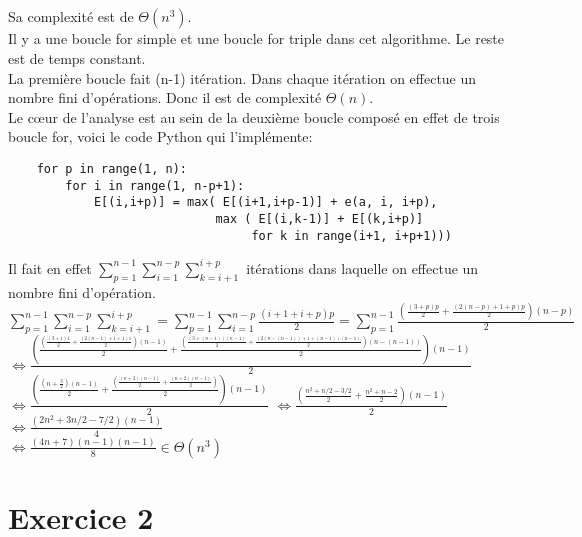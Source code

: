 \documentclass[french]{article}
\begin{document}
\subsection{}
Sa complexité est de $\Theta(n^3)$.\\
Il y a une boucle for simple et une boucle for triple dans cet algorithme. Le reste est de temps constant.\\
La première boucle fait (n-1) itération. Dans chaque itération on effectue un nombre fini d'opérations. Donc il est de complexité $\Theta(n)$.\\
Le cœur de l'analyse est au sein de la deuxième boucle composé en effet de trois boucle for, voici le code Python qui l'implémente:
\begin{lstlisting}
    for p in range(1, n):
        for i in range(1, n-p+1):
            E[(i,i+p)] = max( E[(i+1,i+p-1)] + e(a, i, i+p),
                             max ( E[(i,k-1)] + E[(k,i+p)]
                                  for k in range(i+1, i+p+1)))
\end{lstlisting}
Il fait en effet $\sum_{p=1}^{n-1}\sum_{i=1}^{n-p}\sum_{k=i+1}^{i+p}$ itérations dans laquelle on effectue un nombre fini d'opération.\\
$\sum_{p=1}^{n-1}\sum_{i=1}^{n-p}\sum_{k=i+1}^{i+p}=\sum_{p=1}^{n-1}\sum_{i=1}^{n-p}\frac{(i+1+i+p)p}{2}=\sum_{p=1}^{n-1}\frac{( \frac{(3+p)p}{2} + \frac{(2(n-p) + 1 + p)p}{2}) (n-p)}{2}$\\
$\Leftrightarrow \frac{
(\frac{( \frac{(3+1)1}{2} + \frac{(2(n-1) + 1 + 1)1}{2}) (n-1)}{2} + 
\frac{( \frac{(3+(n-1))(n-1)}{2} + \frac{(2(n-(n-1)) + 1 + (n-1))(n-1)}{2}) (n-(n-1))}{2})(n-1)}
{2}$\\
$\Leftrightarrow \frac{
(\frac{( n + \frac{3}{2}) (n-1)}{2} + 
\frac{( \frac{(n+2)(n-1)}{2} + \frac{(n+2)(n-1)}{2}) }{2})(n-1)}
{2}$
$\Leftrightarrow \frac{
(\frac{n^2 +  n/2 - 3/2}{2} + 
\frac{n^2 + n - 2}{2})(n-1)}
{2}$
$\Leftrightarrow \frac{
(2n^2 + 3n/2 - 7/2)(n-1)}
{4}$\\
$\Leftrightarrow \frac{
(4n+7)(n-1)(n-1)}
{8} \in \Theta(n^3) $

\section{Exercice 2}
\end{document}

